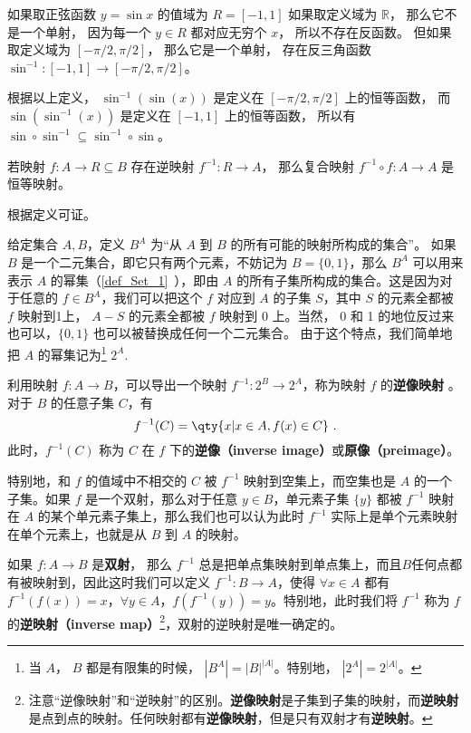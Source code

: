 \begin{example}{}
如果取正弦函数 $y = \sin x$ 的值域为 $R = [-1, 1]$ 如果取定义域为 $\mathbb R$，  那么它不是一个单射， 因为每一个 $y \in R$ 都对应无穷个 $x$， 所以不存在反函数。 但如果取定义域为 $[-\pi/2, \pi/2]$， 那么它是一个单射， 存在反三角函数 $\sin^{-1}: [-1, 1] \to [-\pi/2, \pi/2]$。

根据以上定义， $\sin^{-1} (\sin(x))$ 是定义在 $[-\pi/2, \pi/2]$ 上的恒等函数， 而 $\sin (\sin^{-1}(x))$ 是定义在 $[-1, 1]$ 上的恒等函数， 所以有 $\sin \circ \sin^{-1} \subseteq \sin^{-1} \circ \sin$。
\end{example}

\begin{corollary}{}
若映射 $f: A  \to R \subseteq B$ 存在逆映射 $f^{-1}: R \to A$， 那么复合映射 $f^{-1} \circ f: A \to A$ 是恒等映射。
\end{corollary}
根据定义可证。


给定集合 $A, B$，定义 $B^A$ 为“从 $A$ 到 $B$ 的所有可能的映射所构成的集合”。 如果 $B$ 是一个二元集合，即它只有两个元素，不妨记为 $B=\{0,1\}$，那么 $B^A$ 可以用来表示 $A$ 的幂集（\autoref{def_Set_1}~），即由 $A$ 的所有子集所构成的集合。这是因为对于任意的 $f\in B^A$，我们可以把这个 $f$ 对应到 $A$ 的子集 $S$，其中 $S$ 的元素全都被 $f$ 映射到1上， $A-S$ 的元素全都被 $f$ 映射到 0 上。当然， 0 和 1 的地位反过来也可以，$\{0, 1\}$ 也可以被替换成任何一个二元集合。 由于这个特点，我们简单地把 $A$ 的幂集记为\footnote{当 $A$， $B$ 都是有限集的时候， $|B^A|=|B|^{|A|}$。特别地， $|2^A|=2^{|A|}$。}  $2^A$. 

利用映射 $f: A \to B$，可以导出一个映射 $f^{-1}:2^B \to 2^A$，称为映射 $f$ 的\textbf{逆像映射} 。对于 $B$ 的任意子集 $C$，有
\begin{equation}
f^{-1}(C) = \qty{x | x \in A, f(x) \in C}~.
\end{equation}
此时，$f^{-1}(C)$ 称为 $C$ 在 $f$ 下的\textbf{逆像（inverse image）}或\textbf{原像（preimage）}。

特别地，和 $f$ 的值域中不相交的 $C$ 被 $f^{-1}$ 映射到空集上，而空集也是 $A$ 的一个子集。如果 $f$ 是一个双射，那么对于任意 $y\in B$，单元素子集 $\{y\}$ 都被 $f^{-1}$ 映射在 $A$ 的某个单元素子集上，那么我们也可以认为此时 $f^{-1}$ 实际上是单个元素映射在单个元素上，也就是从 $B$ 到 $A$ 的映射。

如果 $f: A \to B$ 是\textbf{双射}， 那么 $f^{-1}$ 总是把单点集映射到单点集上，而且$B$任何点都有被映射到，因此这时我们可以定义 $f^{-1}:B \to A$，使得 $\forall x \in A$ 都有 $f^{-1}(f(x)) = x$，$\forall y \in A$，$f(f^{-1}(y)) = y$。特别地，此时我们将 $f^{-1}$ 称为 $f$ 的\textbf{逆映射（inverse map）}\footnote{注意“逆像映射”和“逆映射”的区别。\textbf{逆像映射}是子集到子集的映射，而\textbf{逆映射}是点到点的映射。任何映射都有\textbf{逆像映射}，但是只有双射才有\textbf{逆映射}。}，双射的逆映射是唯一确定的。

